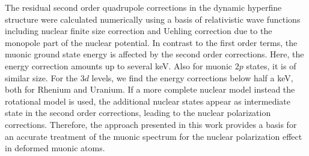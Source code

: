 The residual second order quadrupole corrections in the dynamic hyperfine structure were calculated numerically using a basis of relativistic wave functions including nuclear finite size correction and Uehling correction due to the monopole part of the nuclear potential.
In contrast to the first order terms, the muonic ground state energy is affected by the second order corrections. Here, the energy correction amounts up to several keV. Also for muonic $2p$ states, it is of similar size. For the $3d$ levels, we find the energy corrections below half a keV, both for Rhenium and Uranium.
If a more complete nuclear model instead the rotational model is used, the additional nuclear states appear as intermediate state in the second order corrections, leading to the nuclear polarization corrections. Therefore, the approach presented in this work provides a basis for an accurate treatment of the muonic spectrum for the nuclear polarization effect in deformed muonic atoms.


